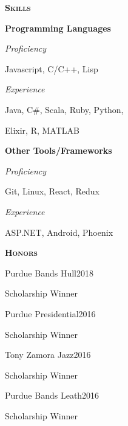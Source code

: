 \documentclass[11pt]{article}
\newcommand{\sectionfont}{\Large\scshape\bfseries\color{cg505green}}
\begin{document}
\begin{minipage}[t]{0.3\textwidth}
  \vspace{10pt}

  {\sectionfont Skills}

  \textbf{Programming Languages}
  \begin{adjustwidth}{10pt}{}
    \emph{Proficiency}

    \quad Javascript, C/C++, Lisp

    \emph{Experience}

    \quad Java, C\#, Scala, Ruby, Python,

    \quad Elixir, R, MATLAB
  \end{adjustwidth}

  \textbf{Other Tools/Frameworks}
  \begin{adjustwidth}{10pt}{}
    \emph{Proficiency}

    \quad Git, Linux, React, Redux

    \emph{Experience}

    \quad ASP.NET, Android, Phoenix
  \end{adjustwidth}

  \vspace{10pt}

  {\sectionfont Honors}
  \begin{adjustwidth}{10pt}{}
    Purdue Bands Hull\hfill 2018

    \quad Scholarship Winner

    Purdue Presidential\hfill 2016

    \quad Scholarship Winner

    Tony Zamora Jazz\hfill 2016

    \quad Scholarship Winner

    Purdue Bands Leath\hfill 2016

    \quad Scholarship Winner






  \end{adjustwidth}
\end{minipage}
\hfill\vrule\hfill{}
\end{document}
